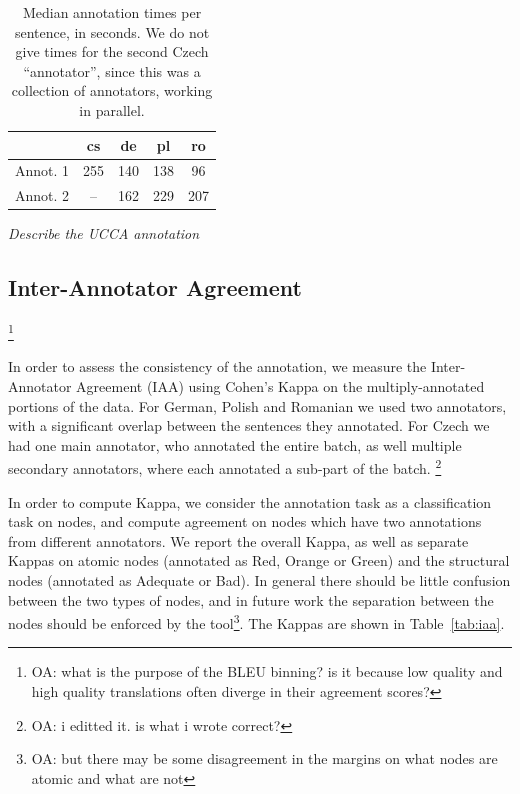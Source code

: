 \documentclass[11pt]{article}
\newcommand{\tabref}[1]{Table~\ref{#1}}
\newcommand{\oa}[1]{\footnote{\color{red}OA: #1}}
\begin{document}
\begin{table}
\begin{center}
\begin{tabular}{l|cccc}
& cs & de & pl & ro \\
\hline
Annot. 1 & 255 & 140  & 138 & 96 \\
Annot. 2 & -- & 162 & 229 & 207 \\
\end{tabular}
\caption{Median annotation times per sentence, in seconds.
We do not give times for the second Czech 
``annotator'', since this was a collection of annotators, working in parallel.}
\label{tab:annot_times}
\end{center}
\end{table}


\emph{Describe the UCCA annotation}


\subsection{Inter-Annotator Agreement}
\label{sec:iaa}

\oa{what is the purpose of the BLEU binning? is it because low quality and high
quality translations often diverge in their agreement scores?}

In order to assess the consistency of the annotation, we measure the Inter-Annotator
Agreement (IAA) using Cohen's Kappa on the multiply-annotated portions of the data.
For German, Polish and Romanian we used two annotators, with a significant overlap
between the sentences they annotated. For Czech we had one main annotator, who
annotated the entire batch, as well multiple secondary annotators, where
each annotated a sub-part of the batch. \oa{i editted it. is what i wrote correct?}

In order to compute Kappa, we consider the annotation task as a classification task on 
nodes, and compute agreement on nodes which have two annotations from different annotators.
We report the overall Kappa, as well as separate Kappas on atomic
nodes (annotated as Red, Orange or Green) and the structural nodes (annotated
as Adequate or Bad). In general there should be little confusion between the two
types of nodes, and in future work the separation between the nodes should be enforced
by the tool\oa{but there may be some disagreement in the margins on what nodes are atomic and
  what are not}. The Kappas are shown in \tabref{tab:iaa}.
\end{document}
